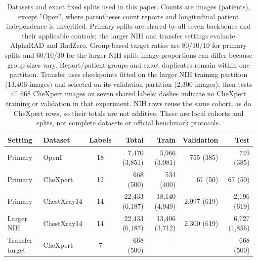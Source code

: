 \begin{table}[!t]
\centering
\footnotesize
\setlength{\tabcolsep}{3pt}
\renewcommand{\arraystretch}{1.15}
\begin{tabular*}{\textwidth}{@{\extracolsep{\fill}}llcrrrr@{}}
\toprule
Setting & Dataset & Labels & Total & Train & Validation & Test \\
\midrule
Primary & OpenI$^{\dagger}$ & 18 & 7,470 (3,851) & 5,966 (3,081) & 755 (385) & 749 (385) \\
Primary & CheXpert & 12 & 668 (500) & 534 (400) & 67 (50) & 67 (50) \\
Primary & ChestXray14 & 14 & 22,433 (6,187) & 18,140 (4,949) & 2,097 (619) & 2,196 (619) \\
\midrule
Larger NIH & ChestXray14 & 14 & 22,433 (6,187) & 13,406 (3,712) & 2,300 (619) & 6,727 (1,856) \\
\midrule
Transfer target & CheXpert & 7 & 668 (500) & --- & --- & 668 (500) \\
\bottomrule
\end{tabular*}
\caption{Datasets and exact fixed splits used in this paper. Counts are images (patients), except $^{\dagger}$OpenI, where parentheses count reports and longitudinal patient independence is unverified. Primary splits are shared by all seven backbones and their applicable controls; the larger NIH and transfer settings evaluate AlphaRAD and RadZero. Group-based target ratios are 80/10/10 for primary splits and 60/10/30 for the larger NIH split; image proportions can differ because group sizes vary. Report/patient groups and exact duplicates remain within one partition. Transfer uses checkpoints fitted on the larger NIH training partition (13,406 images) and selected on its validation partition (2,300 images), then tests all 668 CheXpert images on seven shared labels; dashes indicate no CheXpert training or validation in that experiment. NIH rows reuse the same cohort, as do CheXpert rows, so their totals are not additive. These are local cohorts and splits, not complete datasets or official benchmark protocols.}
\label{tab:token_mlp_dataset_splits}
\end{table}
